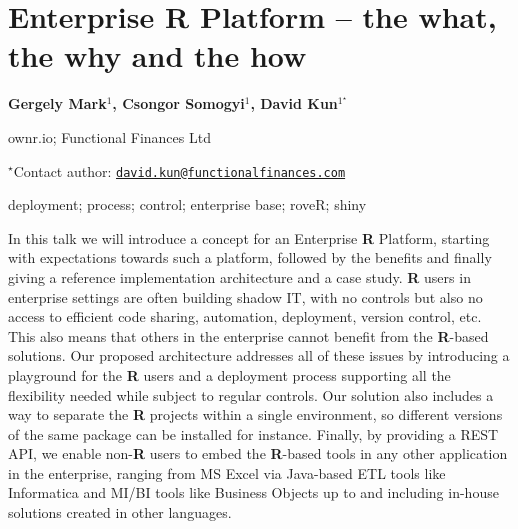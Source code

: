 \documentclass[\main/boa.tex]{subfiles}
\begin{document}
\section{Enterprise R Platform -- the what, the why and the how}

\begin{center}
  {\bf Gergely Mark$^{1}$, Csongor Somogyi$^{1}$, David Kun$^{1^\star}$}
\end{center}

\vskip 0.3cm

\begin{affiliations}
\begin{enumerate}
\begin{minipage}{0.915\textwidth}
\centering
\item ownr.io; Functional Finances Ltd \\[-2pt]
\end{minipage}
\end{enumerate}
$^\star$Contact author: \href{mailto:david.kun@functionalfinances.com}{\nolinkurl{david.kun@functionalfinances.com}}\\
\end{affiliations}

\vskip 0.5cm

\begin{minipage}{0.915\textwidth}
\keywords deployment; process; control; enterprise
\packages base; roveR; shiny
\end{minipage}

\vskip 0.8cm

In this talk we will introduce a concept for an Enterprise \textbf{R}
Platform, starting with expectations towards such a platform, followed
by the benefits and finally giving a reference implementation
architecture and a case study. \textbf{R} users in enterprise settings
are often building shadow IT, with no controls but also no access to
efficient code sharing, automation, deployment, version control, etc.
This also means that others in the enterprise cannot benefit from the
\textbf{R}-based solutions. Our proposed architecture addresses all of
these issues by introducing a playground for the \textbf{R} users and a
deployment process supporting all the flexibility needed while subject
to regular controls. Our solution also includes a way to separate the
\textbf{R} projects within a single environment, so different versions
of the same package can be installed for instance. Finally, by providing
a REST API, we enable non-\textbf{R} users to embed the \textbf{R}-based
tools in any other application in the enterprise, ranging from MS Excel
via Java-based ETL tools like Informatica and MI/BI tools like Business
Objects up to and including in-house solutions created in other
languages.
\end{document}
